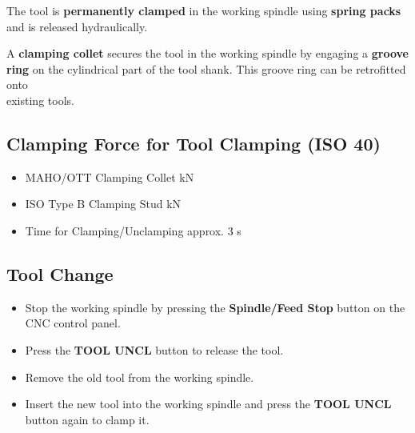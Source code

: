 The tool is \textbf{permanently clamped} in the working spindle using \textbf{spring packs} and is released hydraulically.

A \textbf{clamping collet} secures the tool in the working spindle by engaging a \textbf{groove ring} on the cylindrical part of the tool shank. This groove ring can be retrofitted onto\\ existing tools.\footnotemark


\subsection{Clamping Force for Tool Clamping (ISO 40)}

\begin{itemize}[itemsep=1pt,parsep=0pt]
   \item MAHO/OTT Clamping Collet   kN \\
   \item ISO Type B Clamping Stud \dotfill {} kN \\
  \item  Time for Clamping/Unclamping \dotfill \> approx. 3 s
\end{itemize}

\vspace{0.5cm}

\subsection{Tool Change} \footnotemark


\begin{itemize}
    \item Stop the working spindle by pressing the \textbf{Spindle/Feed Stop} button on the CNC control panel.
    \item Press the \textbf{TOOL UNCL} button to release the tool.
    \item Remove the old tool from the working spindle.
    \item Insert the new tool into the working spindle and press the \textbf{TOOL UNCL} button again to clamp it.
\end{itemize}


